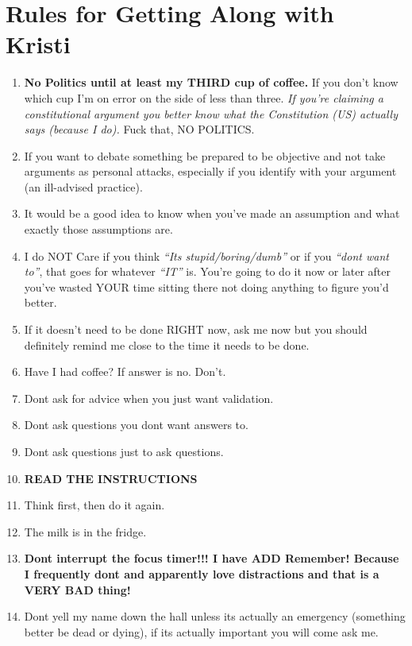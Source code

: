 \documentclass[13pt]{article}
\begin{document}
\pagestyle{empty}
\section*{Rules for Getting Along with Kristi}

\begin{enumerate}
\item \textbf{No Politics until at least my THIRD cup of coffee.} If you don't know which cup I'm on error on the side of less than three. \emph{If you're claiming a constitutional argument you better know what the Constitution (US) actually says (because I do).} Fuck that, NO POLITICS.
\item If you want to debate something be prepared to be objective and not take arguments as personal attacks, especially if you identify with your argument (an ill-advised practice).
\item It would be a good idea to know when you've made an assumption and what exactly those assumptions are.
\item I do NOT Care if you think \emph{``Its stupid/boring/dumb''} or if you \emph{``dont want to''}, that goes for whatever \emph{``IT''} is. You're going to do it now or later after you've wasted YOUR time sitting there not doing anything to figure you'd better.
\item If it doesn't need to be done RIGHT now, ask me now but you should definitely remind me close to the time it needs to be done.
\item Have I had coffee? If answer is no. Don't. 
\item Dont ask for advice when you just want validation.
\item Dont ask questions you dont want answers to.
\item Dont ask questions just to ask questions.
\item \textbf{READ THE INSTRUCTIONS}
\item Think first, then do it again.
\item The milk is in the fridge.
\item \textbf{Dont interrupt the focus timer!!! I have ADD Remember! Because I frequently dont and apparently love distractions and that is a VERY BAD thing!}
\item Dont yell my name down the hall unless its actually an emergency (something better be dead or dying), if its actually important you will come ask me.
\end{enumerate}
\end{document}
